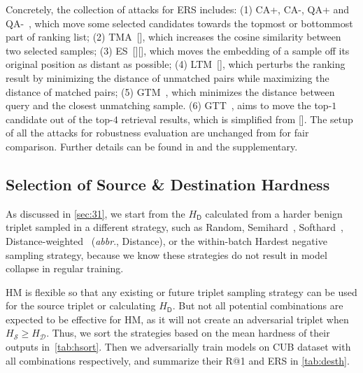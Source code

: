 \documentclass[10pt,twocolumn,letterpaper]{article}
\begin{document}
Concretely, the collection of attacks for ERS includes:
%
(1) CA+, CA-, QA+ and QA-~\cite{advrank}, which move some selected candidates
towards the topmost or bottommost part of ranking list;
%
(2) TMA~[], which increases the cosine similarity between two selected samples;
%
(3) ES~[][], which moves the embedding of a sample off its original position as
distant as possible;
%
(4) LTM~[], which perturbs the ranking result by minimizing the distance of
unmatched pairs while maximizing the distance of matched pairs;
%
(5) GTM~\cite{robrank}, which minimizes the distance between query and the
closest unmatching sample.
%
(6) GTT~\cite{robrank}, aims to move the top-$1$ candidate out of the top-$4$
retrieval results, which is simplified from [].
%
The setup of all the attacks for robustness evaluation are unchanged from
\cite{robrank} for fair comparison.
%
Further details can be found in \cite{robrank} and the supplementary.

\begin{comment}
%
In this section, we first carry out parameter search for the components of the
proposed method, in order to illustrate their effectiveness.
%
The comparison with the state-of-the-art DML defense methods will be presented in the end.
%
\end{comment}

\subsection{Selection of Source \& Destination Hardness}
\label{sec:41}






As discussed in \cref{sec:31}, we start from the $H_\mathsf{D}$ calculated from
a harder benign triplet sampled in a different strategy, such as Random,
Semihard~\cite{facenet}, Softhard~\cite{revisiting},
Distance-weighted~\cite{distance} (\emph{abbr}., Distance), or the within-batch
Hardest negative sampling strategy, because we know these strategies do not
result in model collapse in regular training.


HM is flexible so that any existing or future triplet sampling strategy
can be used for the source triplet or calculating $H_\mathsf{D}$.
%
But not all potential combinations are expected to be effective for HM, as it
will not create an adversarial triplet when $H_\mathcal{S}\geqslant
H_\mathcal{D}$.
%
Thus, we sort the strategies based on the mean hardness of their
outputs in~\cref{tab:hsort}.
%
Then we adversarially train models on CUB dataset with all combinations
respectively, and summarize their R@1 and ERS in \cref{tab:desth}.
\end{document}
